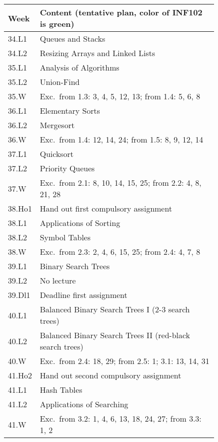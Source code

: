 \documentclass[11pt]{article}
\begin{document}
\begin{figure}[h]
    \centering
    \begin{tabular}{l | l}
        Week& Content (tentative plan, color of {\color{green}INF102} is green) \\
        \hline
        34.L1 & Queues and Stacks \\
        34.L2 & Resizing Arrays and Linked Lists \\
        \hline
        35.L1 & Analysis of Algorithms \\
        35.L2 & Union-Find \\
        35.W  & Exc.\ from 1.3: 3, 4, 5, 12, 13; from 1.4: 5, 6, 8\\
        \hline
        36.L1 & Elementary Sorts \\
        36.L2 & Mergesort \\
        36.W  &  Exc.\ from 1.4: 12, 14, 24; from 1.5: 8, 9, 12, 14\\
        \hline
        37.L1 &  Quicksort \\
        37.L2 & Priority Queues\\
        37.W  &   Exc.\ from 2.1: 8, 10, 14, 15, 25; from 2.2: 4, 8, 21, 28\\
        \hline
        38.Ho1& Hand out first compulsory assignment \\
        38.L1 &   Applications of Sorting \\
        38.L2 & Symbol Tables  \\    
        38.W  &  Exc.\ from 2.3: 2, 4, 6, 15, 25; from 2.4:  4, 7, 8\\
        \hline
        39.L1 & Binary Search Trees \\
        39.L2 & No lecture \\
        39.Dl1& Deadline first assignment\\
        \hline
        40.L1 & Balanced Binary Search Trees I (2-3 search trees)\\
        40.L2 & Balanced Binary Search Trees II (red-black search trees) \\
        40.W  &  Exc.\ from 2.4: 18, 29; from 2.5: 1; 3.1: 13, 14, 31 \\
        \hline
        41.Ho2& Hand out second compulsory assignment \\
        41.L1 & Hash Tables \\
        41.L2 & Applications of Searching \\
        41.W  &  Exc.\ from 3.2: 1, 4, 6, 13, 18, 24, 27; from 3.3: 1, 2\\

\end{tabular}
\end{figure}
\end{document}
